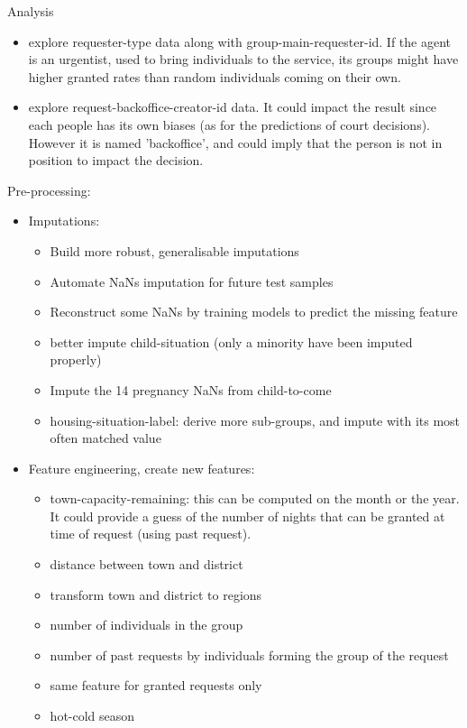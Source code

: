 \documentclass[11pt]{article}
\theoremstyle{definition}
\begin{document}
    Analysis
    \begin{itemize}
        \item explore requester-type data along with group-main-requester-id. If the agent is an urgentist, used to bring individuals to the service, its groups might have higher granted rates than random individuals coming on their own.
        \item explore request-backoffice-creator-id data. It could impact the result since each people has its own biases (as for the predictions of court decisions). However it is named 'backoffice', and could imply that the person is not in position to impact the decision.
    \end{itemize}
    
    Pre-processing:
    \begin{itemize}
        \item Imputations:
        \begin{itemize}
            \item Build more robust, generalisable imputations
            \item Automate NaNs imputation for future test samples
            \item Reconstruct some NaNs by training models to predict the missing feature
            \item better impute child-situation (only a minority have been imputed properly)
            \item Impute the 14 pregnancy NaNs from child-to-come
            \item housing-situation-label: derive more sub-groups, and impute with its most often matched value
        \end{itemize}
        
        \item Feature engineering, create new features:
        \begin{itemize}
            \item town-capacity-remaining: this can be computed on the month or the year. It could provide a guess of the number of nights that can be granted at time of request (using past request).
            \item distance between town and district
            \item transform town and district to regions
            \item number of individuals in the group
            \item number of past requests by individuals forming the group of the request
            \item same feature for granted requests only
            \item hot-cold season
        \end{itemize}
    \end{itemize}
        
\end{document}
